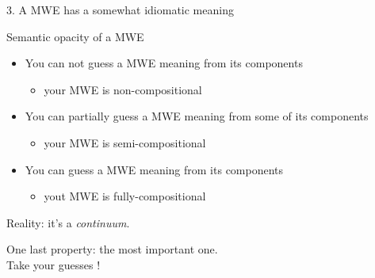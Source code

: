 \documentclass[serif, aspectratio=169]{beamer}
\begin{document}
\begin{frame}{3. A MWE has a somewhat idiomatic meaning}
    \begin{block}{Semantic opacity of a MWE}
        \pause
        \begin{itemize}
            \item You can not guess a MWE meaning from its components
            \begin{itemize}
                \item your MWE is non-compositional
            \end{itemize}
            \vspace{10pt}
            \pause
            \item You can partially guess a MWE meaning from some of its components
            \begin{itemize}
                \item your MWE is semi-compositional
            \end{itemize}
            \vspace{10pt}
            \pause
            \item You can guess a MWE meaning from its components
            \begin{itemize}
                \item yout MWE is fully-compositional
            \end{itemize}
        \end{itemize}
    \end{block}
    \pause
    \begin{center}
        \Large
        Reality: it's a \textit{continuum}.
    \end{center}
\end{frame}

\begin{exoframe}{}
    \begin{center}
        \Large
        One last property: the most important one. \\
        \vspace{10pt}
        Take your guesses !
    \end{center}
\end{exoframe}
\end{document}

